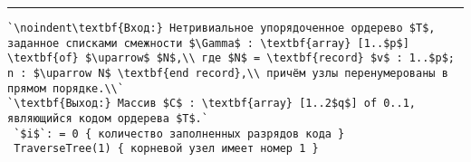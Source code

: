 \vspace{5pt} \hrule

\begin{lstlisting}[caption={Построение кода упорядоченного ордерева}, label=p305, escapechar=`]
`\noindent\textbf{Вход:} Нетривиальное упорядоченное ордерево $T$, заданное списками смежности $\Gamma$ : \textbf{array} [1..$p$] \textbf{of} $\uparrow$ $N$,\\ где $N$ = \textbf{record} $v$ : 1..$p$; n : $\uparrow N$ \textbf{end record},\\ причём узлы перенумерованы в прямом порядке.\\`
`\textbf{Выход:} Массив $C$ : \textbf{array} [1..2$q$] of 0..1, являющийся кодом ордерева $T$.`
 `$i$`: = 0 { количество заполненных разрядов кода }
 TraverseTree(1) { корневой узел имеет номер 1 }
\end{lstlisting}
